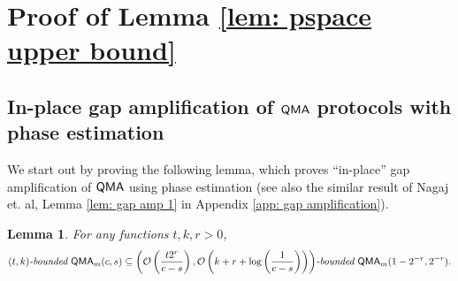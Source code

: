 \documentclass[11pt]{article}
\newtheorem{lemma}[theorem]{Lemma}
\theoremstyle{definition}
\theoremstyle{remark}
\newcommand\QMA{{\sf{QMA}}}
\newcommand\bddQMA[5]{{\left(#1,#2\right)}\textit{-bounded }\QMA_{#3}(#4,#5)}
\begin{document}
\section{Proof of Lemma \ref{lem: pspace upper bound}} \label{app: pspace upper bound}
\subsection{In-place gap amplification of $\QMA$ protocols with phase estimation}\label{app: space efficient amplification}

We start out by proving the following lemma, which proves ``in-place'' gap amplification of $\QMA$ using phase estimation (see also the similar result of Nagaj et. al, Lemma \ref{lem: gap amp 1} in Appendix \ref{app: gap amplification}).
\begin{lemma} \label{lem: gap amp 2}
For any functions $t,k,r>0$, 
\[
\bddQMA{t}{k}{m}{c}{s}\subseteq\bddQMA{\mathcal{O}\left(\frac{t2^r}{c-s}\right)}{\mathcal{O}\left(k+r+\log\left(\frac{1}{c-s}\right)\right)}{m}{1-2^{-r}}{2^{-r}}.
\]
\end{lemma}
\end{document}
